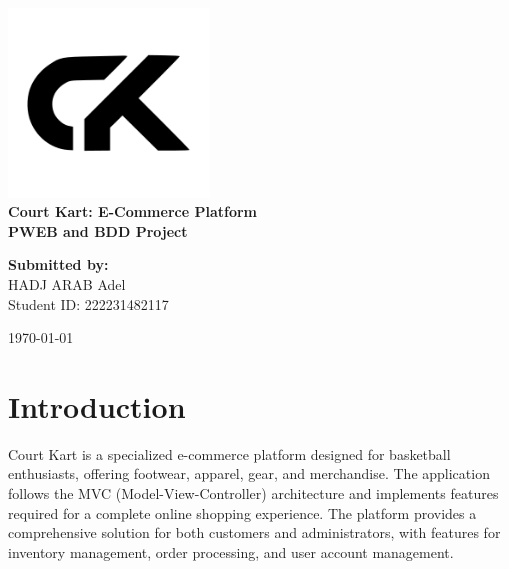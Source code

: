 \documentclass[14pt,a4paper]{article}
\begin{document}
\begin{titlepage}
	\centering
	\vspace*{1cm}

	\includegraphics[width=0.4\textwidth]{../public/assets/images/court-kart-logo.png}\\[1.5cm]

	\textbf{\LARGE Court Kart: E-Commerce Platform}\\[0.5cm]
	\textbf{\Large PWEB and BDD Project}\\[2cm]

	\begin{minipage}{0.45\textwidth}
		\begin{flushleft}
			\large
			\textbf{Submitted by:}\\
			HADJ ARAB Adel\\
			Student ID: 222231482117\\
		\end{flushleft}
	\end{minipage}

	\vfill

	{\large \today}

\end{titlepage}

\newpage
\tableofcontents
\newpage

\section{Introduction}

Court Kart is a specialized e-commerce platform designed for basketball enthusiasts, offering footwear, apparel, gear, and merchandise. The application follows the MVC (Model-View-Controller) architecture and implements features required for a complete online shopping experience. The platform provides a comprehensive solution for both customers and administrators, with features for inventory management, order processing, and user account management.
\end{document}
